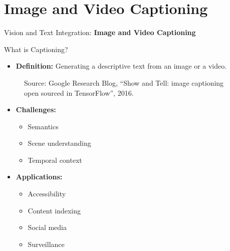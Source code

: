 \section{Image and Video Captioning}
\begin{frame}{}
    \LARGE Vision and Text Integration: \textbf{Image and Video Captioning}
\end{frame}

\begin{frame}[allowframebreaks]{What is Captioning?}
    \begin{itemize}
        \item \textbf{Definition:} Generating a descriptive text from an image or a video.
    \end{itemize}
    \begin{figure}
        \centering
        \caption*{Source: Google Research Blog, ``Show and Tell: image captioning open sourced in TensorFlow'', 2016.}
    \end{figure}
\framebreak
    \begin{itemize}
        \item \textbf{Challenges:}
        \begin{itemize}
            \item Semantics
            \item Scene understanding
            \item Temporal context
        \end{itemize}
        \item \textbf{Applications:}
        \begin{itemize}
            \item Accessibility
            \item Content indexing
            \item Social media
            \item Surveillance
        \end{itemize}
    \end{itemize}
\end{frame}

